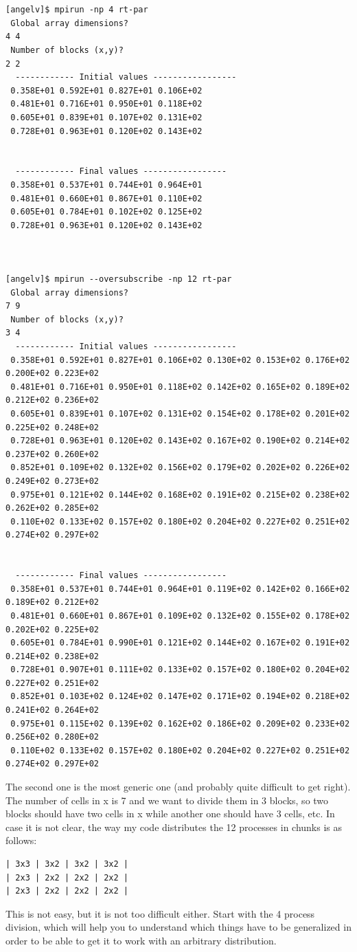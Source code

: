 \begin{verbatim}


[angelv]$ mpirun -np 4 rt-par 
 Global array dimensions?
4 4
 Number of blocks (x,y)?
2 2
  ------------ Initial values -----------------
 0.358E+01 0.592E+01 0.827E+01 0.106E+02
 0.481E+01 0.716E+01 0.950E+01 0.118E+02
 0.605E+01 0.839E+01 0.107E+02 0.131E+02
 0.728E+01 0.963E+01 0.120E+02 0.143E+02
 
 
  ------------ Final values -----------------
 0.358E+01 0.537E+01 0.744E+01 0.964E+01
 0.481E+01 0.660E+01 0.867E+01 0.110E+02
 0.605E+01 0.784E+01 0.102E+02 0.125E+02
 0.728E+01 0.963E+01 0.120E+02 0.143E+02



[angelv]$ mpirun --oversubscribe -np 12 rt-par 
 Global array dimensions?
7 9
 Number of blocks (x,y)?
3 4
  ------------ Initial values -----------------
 0.358E+01 0.592E+01 0.827E+01 0.106E+02 0.130E+02 0.153E+02 0.176E+02 0.200E+02 0.223E+02
 0.481E+01 0.716E+01 0.950E+01 0.118E+02 0.142E+02 0.165E+02 0.189E+02 0.212E+02 0.236E+02
 0.605E+01 0.839E+01 0.107E+02 0.131E+02 0.154E+02 0.178E+02 0.201E+02 0.225E+02 0.248E+02
 0.728E+01 0.963E+01 0.120E+02 0.143E+02 0.167E+02 0.190E+02 0.214E+02 0.237E+02 0.260E+02
 0.852E+01 0.109E+02 0.132E+02 0.156E+02 0.179E+02 0.202E+02 0.226E+02 0.249E+02 0.273E+02
 0.975E+01 0.121E+02 0.144E+02 0.168E+02 0.191E+02 0.215E+02 0.238E+02 0.262E+02 0.285E+02
 0.110E+02 0.133E+02 0.157E+02 0.180E+02 0.204E+02 0.227E+02 0.251E+02 0.274E+02 0.297E+02
 
 
  ------------ Final values -----------------
 0.358E+01 0.537E+01 0.744E+01 0.964E+01 0.119E+02 0.142E+02 0.166E+02 0.189E+02 0.212E+02
 0.481E+01 0.660E+01 0.867E+01 0.109E+02 0.132E+02 0.155E+02 0.178E+02 0.202E+02 0.225E+02
 0.605E+01 0.784E+01 0.990E+01 0.121E+02 0.144E+02 0.167E+02 0.191E+02 0.214E+02 0.238E+02
 0.728E+01 0.907E+01 0.111E+02 0.133E+02 0.157E+02 0.180E+02 0.204E+02 0.227E+02 0.251E+02
 0.852E+01 0.103E+02 0.124E+02 0.147E+02 0.171E+02 0.194E+02 0.218E+02 0.241E+02 0.264E+02
 0.975E+01 0.115E+02 0.139E+02 0.162E+02 0.186E+02 0.209E+02 0.233E+02 0.256E+02 0.280E+02
 0.110E+02 0.133E+02 0.157E+02 0.180E+02 0.204E+02 0.227E+02 0.251E+02 0.274E+02 0.297E+02
\end{verbatim}

The second one is the most generic one (and probably quite difficult to get
right). The number of cells in x is 7 and we want to divide them in 3 blocks, so
two blocks should have two cells in x while another one should have 3 cells,
etc.  In case it is not clear, the way my code distributes the 12 processes in
chunks is as follows:

\begin{verbatim}
| 3x3 | 3x2 | 3x2 | 3x2 |
| 2x3 | 2x2 | 2x2 | 2x2 |
| 2x3 | 2x2 | 2x2 | 2x2 |
\end{verbatim}

This is not easy, but it is not too difficult either. Start with the 4 process
division, which will help you to understand which things have to be generalized
in order to be able to get it to work with an arbitrary distribution.

